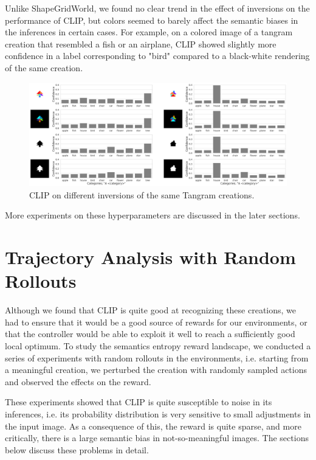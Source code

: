 Unlike ShapeGridWorld, we found no clear trend in the effect of inversions on the performance of CLIP, but colors seemed to barely affect the semantic biases in the inferences in certain cases.
For example, on a colored image of a tangram creation that resembled a fish or an airplane, CLIP showed slightly more confidence in a label corresponding to "bird" compared to a black-white rendering of the same creation.
\begin{figure}[H]
    \centering
    \includegraphics[width=\textwidth]{images/tangram_inversions.png}
    \caption{CLIP on different inversions of the same Tangram creations.}
    \label{fig:clip-tangram-inversions}
\end{figure}

More experiments on these hyperparameters are discussed in the later sections.


\section{Trajectory Analysis with Random Rollouts}
\label{sec:clip-problems}
Although we found that CLIP is quite good at recognizing these creations, we had to ensure that it would be a good source of rewards for our environments, or that the controller would be able to exploit it well to reach a sufficiently good local optimum.
To study the semantics entropy reward landscape, we conducted a series of experiments with random rollouts in the environments, i.e. starting from a meaningful creation, we perturbed the creation with randomly sampled actions and observed the effects on the reward.

These experiments showed that CLIP is quite susceptible to noise in its inferences, i.e. its probability distribution is very sensitive to small adjustments in the input image.
As a consequence of this, the reward is quite sparse, and more critically, there is a large semantic bias in not-so-meaningful images.
The sections below discuss these problems in detail.

